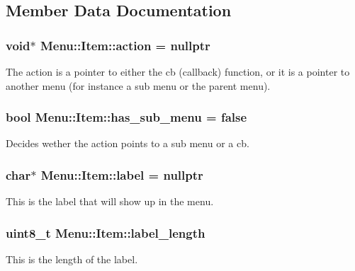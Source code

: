 \subsection{Member Data Documentation}
\subsubsection[{\texorpdfstring{action}{action}}]{\setlength{\rightskip}{0pt plus 5cm}void$\ast$ Menu\+::\+Item\+::action = nullptr}\hypertarget{struct_menu_1_1_item_a247e140fed2addf80986ba5a3506b9dd}{}\label{struct_menu_1_1_item_a247e140fed2addf80986ba5a3506b9dd}
The action is a pointer to either the cb (callback) function, or it is a pointer to another menu (for instance a sub menu or the parent menu). 
\subsubsection[{\texorpdfstring{has\+\_\+sub\+\_\+menu}{has_sub_menu}}]{\setlength{\rightskip}{0pt plus 5cm}bool Menu\+::\+Item\+::has\+\_\+sub\+\_\+menu = false}\hypertarget{struct_menu_1_1_item_a5c9895a137458b9a12dafd447ac7430b}{}\label{struct_menu_1_1_item_a5c9895a137458b9a12dafd447ac7430b}
Decides wether the action points to a sub menu or a cb. 
\subsubsection[{\texorpdfstring{label}{label}}]{\setlength{\rightskip}{0pt plus 5cm}char$\ast$ Menu\+::\+Item\+::label = nullptr}\hypertarget{struct_menu_1_1_item_a378723382fc64c752a85ffe6fec9707e}{}\label{struct_menu_1_1_item_a378723382fc64c752a85ffe6fec9707e}
This is the label that will show up in the menu. 
\subsubsection[{\texorpdfstring{label\+\_\+length}{label_length}}]{\setlength{\rightskip}{0pt plus 5cm}uint8\+\_\+t Menu\+::\+Item\+::label\+\_\+length}\hypertarget{struct_menu_1_1_item_a46749d046bbbde8d5308848d5394c2dc}{}\label{struct_menu_1_1_item_a46749d046bbbde8d5308848d5394c2dc}
This is the length of the label. 
